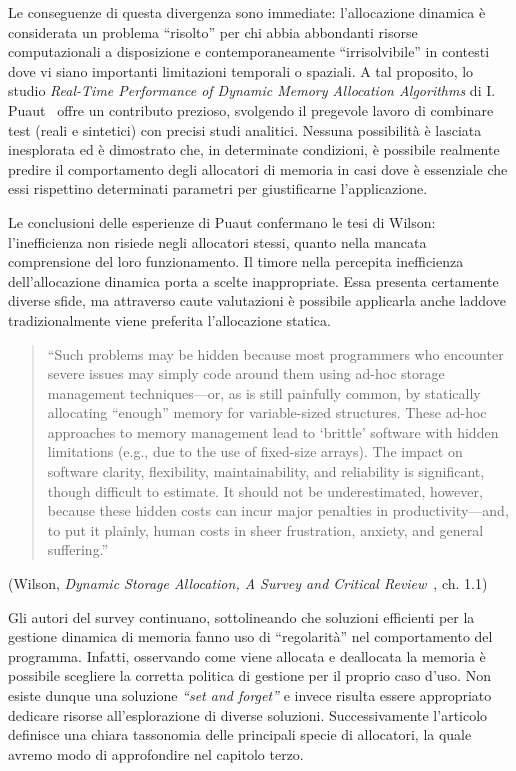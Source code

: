 Le conseguenze di questa divergenza sono immediate: l’allocazione dinamica è considerata un problema ``risolto'' per chi abbia abbondanti risorse computazionali a disposizione e contemporaneamente ``irrisolvibile'' in contesti dove vi siano importanti limitazioni temporali o spaziali. A tal proposito, lo studio \textit{Real-Time Performance of Dynamic Memory Allocation Algorithms} di I. Puaut~\cite{puaut2002} offre un contributo prezioso, svolgendo il pregevole lavoro di combinare test (reali e sintetici) con precisi studi analitici. Nessuna possibilità è lasciata inesplorata ed è dimostrato che, in determinate condizioni, è possibile realmente predire il comportamento degli allocatori di memoria in casi dove è essenziale che essi rispettino determinati parametri per giustificarne l’applicazione.

Le conclusioni delle esperienze di Puaut confermano le tesi di Wilson: l’inefficienza non risiede negli allocatori stessi, quanto nella mancata comprensione del loro funzionamento. Il timore nella percepita inefficienza dell’allocazione dinamica porta a scelte inappropriate. Essa presenta certamente diverse sfide, ma attraverso caute valutazioni è possibile applicarla anche laddove tradizionalmente viene preferita l’allocazione statica.

\begin{quote}
``Such problems may be hidden because most programmers who encounter severe issues may simply code around them using ad-hoc storage management techniques---or, as is still painfully common, by statically allocating ``enough'' memory for variable-sized structures. These ad-hoc approaches to memory management lead to `brittle' software with hidden limitations (e.g., due to the use of fixed-size arrays). The impact on software clarity, flexibility, maintainability, and reliability is significant, though difficult to estimate. It should not be underestimated, however, because these hidden costs can incur major penalties in productivity---and, to put it plainly, human costs in sheer frustration, anxiety, and general suffering.''
\end{quote}
\begin{flushright}
(Wilson, \textit{Dynamic Storage Allocation, A Survey and Critical Review}~\cite{wilson1995}, ch. 1.1)
\end{flushright}

Gli autori del survey continuano, sottolineando che soluzioni efficienti per la gestione dinamica di memoria fanno uso di ``regolarità'' nel comportamento del programma. Infatti, osservando come viene allocata e deallocata la memoria è possibile scegliere la corretta politica di gestione per il proprio caso d’uso. Non esiste dunque una soluzione \textit{``set and forget''} e invece risulta essere appropriato dedicare risorse all’esplorazione di diverse soluzioni. Successivamente l’articolo definisce una chiara tassonomia delle principali specie di allocatori, la quale avremo modo di approfondire nel capitolo terzo.

